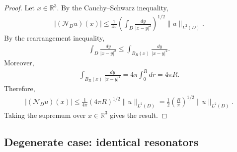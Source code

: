 \documentclass[10pt]{article}
\numberwithin{equation}{section}
\begin{document}
\begin{proof}
Let $x\in\mathbb R^3$. By the Cauchy--Schwarz inequality,
\begin{align*}
    |(\mathcal N_Du)(x)|
    \leq
    \frac{1}{4\pi}
    \left(
        \int_D\frac{dy}{|x-y|^2}
    \right)^{1/2}
    \|u\|_{L^2(D)}.
\end{align*}
By the rearrangement inequality,
\begin{align*}
    \int_D\frac{dy}{|x-y|^2}
    \leq
    \int_{B_R(x)}\frac{dy}{|x-y|^2}.
\end{align*}
Moreover,
\begin{align*}
    \int_{B_R(x)}\frac{dy}{|x-y|^2}
    =
    4\pi\int_0^R dr
    =
    4\pi R.
\end{align*}
Therefore,
\begin{align*}
    |(\mathcal N_Du)(x)|
    \leq
    \frac{1}{4\pi}(4\pi R)^{1/2}\|u\|_{L^2(D)}
    =
    \frac12\left(\frac{R}{\pi}\right)^{1/2}\|u\|_{L^2(D)}.
\end{align*}
Taking the supremum over $x\in\mathbb R^3$ gives the result.
\end{proof}













\subsection{Degenerate case: identical resonators}
\end{document}
